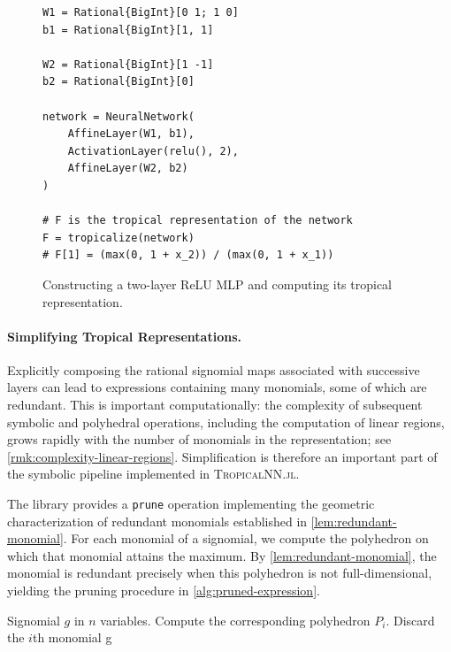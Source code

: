 \documentclass[10pt]{article}
\theoremstyle{definition}
\theoremstyle{remark}
\renewcommand{\vec}[1]{\mathbf{#1}}
\def\va{{\vec{a}}}
\def\vx{{\vec{x}}}
\begin{document}
\begin{figure}[H]
\begin{lstlisting}
W1 = Rational{BigInt}[0 1; 1 0]
b1 = Rational{BigInt}[1, 1]

W2 = Rational{BigInt}[1 -1]
b2 = Rational{BigInt}[0]

network = NeuralNetwork(
    AffineLayer(W1, b1),
    ActivationLayer(relu(), 2),
    AffineLayer(W2, b2)
)

# F is the tropical representation of the network
F = tropicalize(network)
# F[1] = (max(0, 1 + x_2)) / (max(0, 1 + x_1))
\end{lstlisting}
\caption{Constructing a two-layer ReLU MLP and computing its tropical representation.}
\label{fig:mlp-to-trop}
\end{figure}

\paragraph{Simplifying Tropical Representations.} Explicitly composing the rational signomial maps associated with successive layers can lead to expressions containing many monomials, some of which are redundant. This is important computationally: the
complexity of subsequent symbolic and polyhedral operations, including the computation of linear regions, grows rapidly with the number of monomials in the representation; see \cref{rmk:complexity-linear-regions}. Simplification is therefore an important part of the symbolic pipeline implemented in \textsc{TropicalNN.jl}.

The library provides a \texttt{prune} operation implementing the
geometric characterization of redundant monomials established in
\cref{lem:redundant-monomial}. For each monomial of a signomial, we
compute the polyhedron on which that monomial attains the maximum. By
\cref{lem:redundant-monomial}, the monomial is redundant precisely when this polyhedron is not full-dimensional, yielding the pruning procedure in \cref{alg:pruned-expression}.

\begin{algorithm}[H]
  \caption{Pruning tropical expressions.}
    \begin{algorithmic}[1]
        \Require Signomial $g$ in $n$ variables.
        \For{each monomial $c_i \odot \vx^{\odot \va_i}$ of $g$}
            \State Compute the corresponding polyhedron $P_i$.
                \State Discard the $i$th monomial
            \EndIf
        \EndFor
        \State \Return g
    \end{algorithmic}
    \label{alg:pruned-expression}
\end{algorithm}
\end{document}
